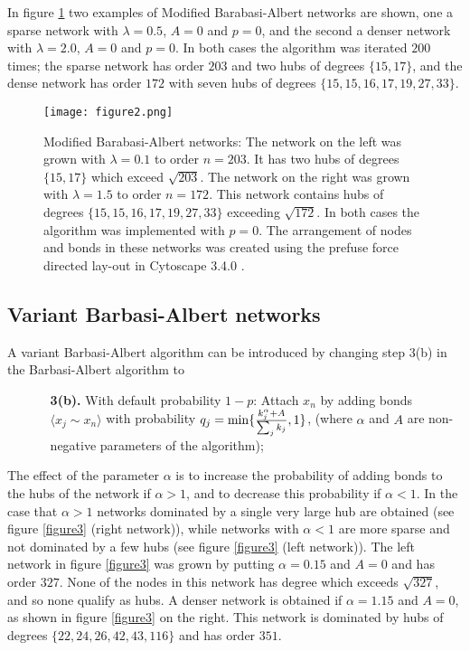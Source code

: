\documentclass[12pt]{iopart}
\def\edge#1#2{{\langle #1{\sim}#2 \rangle}}
\def\sfrac#1#2{\hbox{\normalsize $\frac{#1}{#2}$}}
\begin{document}
In figure \ref{figure2} two examples of Modified Barabasi-Albert networks 
are shown, one a sparse network with $\lambda=0.5$,
$A=0$ and $p=0$, and the second a denser network with $\lambda=2.0$,
$A=0$ and $p=0$.  In both cases the algorithm was iterated $200$ times;
the sparse network has order $203$ and two hubs of degrees $\{15,17\}$, 
and the dense network has order $172$ with seven hubs of degrees
$\{15,15,16,17,19,27,33 \}$.


\begin{figure}[h!]
 \centering
\texttt{[image: figure2.png]}
\caption{{Modified Barabasi-Albert networks:}
The network on the left was grown with $\lambda=0.1$ to order $n=203$.  It has
two hubs of degrees $\{15,17 \}$ which exceed $\sqrt{203}$.
The network on the right was grown with $\lambda=1.5$ to order $n=172$.
This network contains hubs of degrees $\{15,15,16,17,19,27,33 \}$ exceeding
$\sqrt{172}$. In both cases the algorithm was implemented with $p=0$.  
The arrangement of nodes and bonds in
these networks was created using the prefuse force directed lay-out in Cytoscape 3.4.0
\cite{Cytoscape}.}
\label{figure2}
\end{figure}


\subsection{Variant Barbasi-Albert networks}
A variant Barbasi-Albert algorithm can be introduced by changing
step 3(b) in the Barbasi-Albert algorithm to

\begin{enumerate}
\item[\bf ] 
\begin{enumerate}
\item[\bf 3(b).] With default probability $1-p$: Attach $x_n$ by adding bonds
$\edge{x_j}{x_n}$ with probability 
$q_j=\min\{\sfrac{k_j^\alpha+A}{\sum_j k_j},1\}$, (where
$\alpha$ and $A$ are non-negative parameters of the algorithm);
\end{enumerate}
\end{enumerate}

The effect of the parameter $\alpha$ is to increase the probability of adding bonds
to the hubs of the network if $\alpha>1$, and to decrease this probability if
$\alpha<1$.  In the case that $\alpha>1$ networks dominated by a single very
large hub are obtained (see figure \ref{figure3} (right network)), while networks with $\alpha<1$
are more sparse and not dominated by a few hubs (see figure \ref{figure3} (left network)).
The left network in figure \ref{figure3} was grown by putting $\alpha = 0.15$
and $A=0$ and has order $327$.  None of the nodes in this network has degree
which exceeds $\sqrt{327}$, and so none qualify as hubs.  
A denser network is obtained if $\alpha=1.15$ and $A=0$, as shown 
in figure \ref{figure3} on the right.  This network is dominated by
hubs of degrees $\{22,24,26,42,43,116\}$ and has order $351$. 
\end{document}
